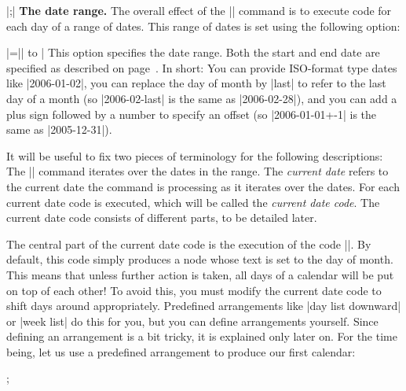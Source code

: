 \begin{command}{\calendar {}|;|}
  \medskip
  \textbf{The date range.}
  The overall effect of the |\calendar| command is to execute code for
  each day of a range of dates. This range of dates is set using the
  following option:
  \begin{itemize}
    |=|| to | This
    option specifies the date range. Both the start and end date are
    specified as described on page~\pageref{calendar-date-format}. In
    short: You can provide ISO-format type dates like |2006-01-02|, you
    can replace the day of month by |last| to refer to the last day of a
    month (so |2006-02-last| is the same as |2006-02-28|), and you can
    add a plus sign followed by a number to specify an offset (so
    |2006-01-01+-1| is the same as |2005-12-31|).
  \end{itemize}
  It will be useful to fix two pieces of terminology for the following
  descriptions: The |\calendar| command iterates over the dates in the
  range. The \emph{current date} refers to the current date the
  command is processing as it iterates over the dates. For each
  current date code is executed, which will be called the
  \emph{current date code}. The current date code consists of
  different parts, to be detailed later.
  
  The central part of the current date code is the execution of the
  code |\tikzdaycode|. By default, this code simply produces a node
  whose text is set to the day of month. This means that unless further
  action is taken, all days of a calendar will be put on top of each
  other! To avoid this, you must modify the current date code to shift
  days around appropriately. Predefined arrangements like 
  |day list downward| or |week list| do this for you, but you can
  define arrangements yourself. Since defining an arrangement is a bit
  tricky, it is explained only later on. For the time being, let us
  use a predefined arrangement to produce our first calendar:

\begin{codeexample}[]
\tikz \calendar[dates=2000-01-01 to 2000-01-31,week list];  
\end{codeexample}


\end{command}
